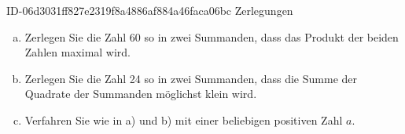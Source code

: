 \begin{exercise}
      {ID-06d3031ff827e2319f8a4886af884a46faca06bc}
      {Zerlegungen}
  \ifproblem\problem
    \begin{enumerate}[a)]
      \item Zerlegen Sie die Zahl 60 so in zwei Summanden,
            dass das Produkt der beiden Zahlen maximal wird.
      \item Zerlegen Sie die Zahl 24 so in zwei Summanden,
            dass die Summe der Quadrate der Summanden möglichst
            klein wird.
      \item Verfahren Sie wie in a) und b) mit einer beliebigen
            positiven Zahl $a$.
    \end{enumerate}
  \fi
\end{exercise}
